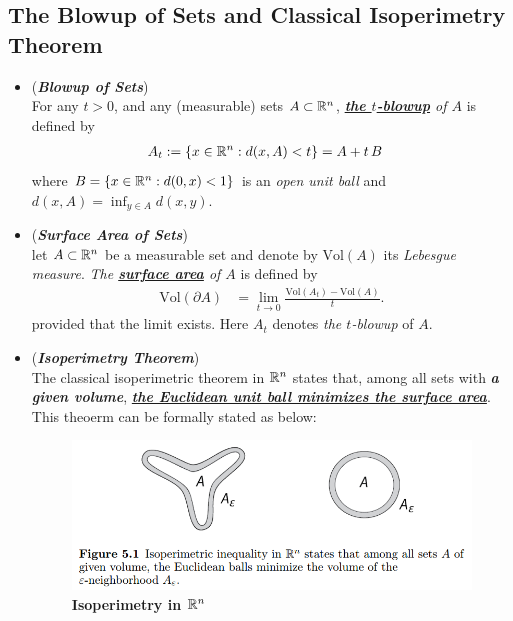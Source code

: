 \documentclass[11pt]{article}
\begin{document}
\subsection{The Blowup of Sets and Classical Isoperimetry Theorem}
\begin{itemize}
\item \begin{definition} (\textbf{\emph{Blowup of Sets}}) \\
For any $t > 0$, and any (measurable) sets $A \subset {\mathbb R}^n$,  \emph{\underline{\textbf{the $t$-blowup}} of $A$} is defined by
\begin{align*}
A_t &:= \left\{x \in {\mathbb R}^n: d(x, A) < t\right\} = A + t\,B
\end{align*} where $B = \left\{x \in {\mathbb R}^n: d(0, x) < 1\right\}$ is an \emph{open unit ball} and $d(x, A) = \inf_{y \in A}d(x, y)$.
\end{definition}

\item \begin{definition}(\textbf{\emph{Surface Area of Sets}}) \\
let $A \subset {\mathbb R}^n$ be a measurable set and denote by $\text{Vol}(A)$ its \emph{Lebesgue measure}. \emph{The  \underline{\textbf{surface area}} of $A$} is
defined by
\begin{align*}
\text{Vol}(\partial A) &= \lim\limits_{t \to 0}\frac{\text{Vol}(A_t) - \text{Vol}(A)}{t}.
\end{align*} provided that the limit exists. Here $A_t$ denotes \emph{the $t$-blowup} of $A$.
\end{definition}

\item \begin{remark}(\textbf{\emph{Isoperimetry Theorem}})\\
The classical isoperimetric theorem in ${\mathbb R}^n$ states that, among all sets with \emph{\textbf{a given volume}}, \underline{\emph{\textbf{the Euclidean unit ball minimizes the surface area}}}.  This theoerm can be formally stated as below:
\end{remark}

\begin{figure}
\begin{minipage}[t]{1\linewidth}
  \centering
  \centerline{\includegraphics[scale = 0.4]{isoperimetry_rn.png}}
\end{minipage}
\caption{\footnotesize{\textbf{Isoperimetry in ${\mathbb R}^{n}$  \citep{vershynin2018high}}}}
\label{fig: isoperimetry_rn}
\end{figure}



\end{itemize}
\end{document}
